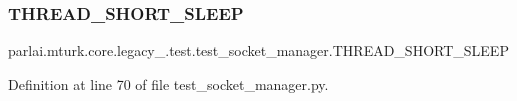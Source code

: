 \subsubsection{\texorpdfstring{T\+H\+R\+E\+A\+D\+\_\+\+S\+H\+O\+R\+T\+\_\+\+S\+L\+E\+EP}{THREAD\_SHORT\_SLEEP}}
{\footnotesize\ttfamily parlai.\+mturk.\+core.\+legacy\+\_.\+test.\+test\+\_\+socket\+\_\+manager.\+T\+H\+R\+E\+A\+D\+\_\+\+S\+H\+O\+R\+T\+\_\+\+S\+L\+E\+EP}



Definition at line 70 of file test\+\_\+socket\+\_\+manager.\+py.

